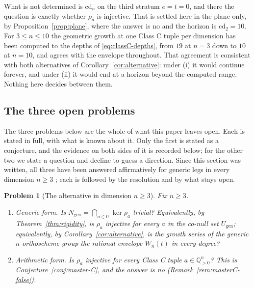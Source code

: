 \documentclass[11pt,a4paper]{article}
\newcommand{\Q}{\mathbb{Q}}
\newcommand{\cd}{\mathrm{cd}}
\newtheorem{problem}[theorem]{Problem}
\theoremstyle{definition}
\theoremstyle{remark}
\theoremstyle{plain}
\begin{document}
What is not determined is $\cd_n$ on the third stratum $e=t=0$, and there the question is
exactly whether $\rho_a$ is injective. That is settled here in the plane only, by
Proposition~\ref{prop:plane}, where the answer is no and the horizon is $\cd_2=10$. For
$3\le n\le10$ the geometric growth at one Class C tuple per dimension has been computed to the
depths of \eqref{eq:classC-depths}, from $19$ at $n=3$ down to $10$ at $n=10$, and agrees with
the envelope throughout. That agreement is consistent with both alternatives of
Corollary~\ref{cor:alternative}: under (i) it would continue forever, and under (ii) it would
end at a horizon beyond the computed range. Nothing here decides between them.

\subsection{The three open problems}

The three problems below are the whole of what this paper leaves open. Each is stated in full,
with what is known about it. Only the first is stated as a conjecture, and the evidence on
both sides of it is recorded below; for the other two we state a question and decline to guess
a direction. Since this section was written, all three have been answered affirmatively for
generic legs in every dimension $n\ge3$ \cite{Bonfioli3}; each is followed by the resolution and
by what stays open.

\begin{problem}[The alternative in dimension $n\ge3$]\label{prob:alternative}
Fix $n\ge3$.
\begin{enumerate}[label=(\alph*),leftmargin=2.2em]
\item \emph{Generic form.} Is $N_{\mathrm{gen}}=\bigcap_{a\in U}\ker\rho_a$ trivial?
Equivalently, by Theorem~\ref{thm:rigidity}, is $\rho_a$ injective for every $a$ in the co-null
set $U_{\mathrm{gen}}$; equivalently, by Corollary~\ref{cor:alternative}, is the growth series
of the generic $n$-orthoscheme group the rational envelope $W_n(t)$ in every degree?
\item \emph{Arithmetic form.} Is $\rho_a$ injective for every Class C tuple
$a\in\Q_{>0}^n$? This is Conjecture~\ref{conj:master-C}, and the answer is \emph{no}
(Remark~\ref{rem:masterC-false}).
\end{enumerate}
\end{problem}
\end{document}
